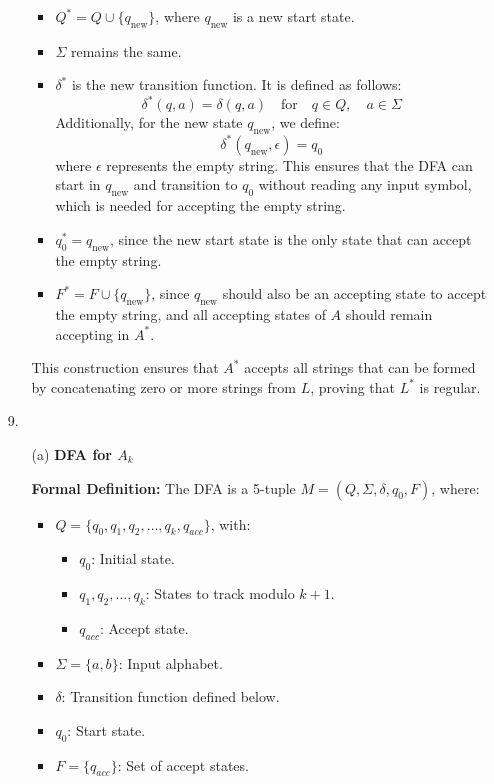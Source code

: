 \documentclass[9pt,tikz,border=2mm]{article}
\begin{document}
\begin{enumerate}
\begin{enumerate}
    \begin{itemize}
        \item \( Q^* = Q \cup \{q_{\text{new}}\} \), where \( q_{\text{new}} \) is a new start state.
        \item \( \Sigma \) remains the same.
        \item \( \delta^* \) is the new transition function. It is defined as follows:
        \[
        \delta^*(q, a) = \delta(q, a) \quad \text{for} \quad q \in Q, \quad a \in \Sigma
        \]
        Additionally, for the new state \( q_{\text{new}} \), we define:
        \[
        \delta^*(q_{\text{new}}, \epsilon) = q_0
        \]
        where \( \epsilon \) represents the empty string. This ensures that the DFA can start in \( q_{\text{new}} \) and transition to \( q_0 \) without reading any input symbol, which is needed for accepting the empty string.
        \item \( q_0^* = q_{\text{new}} \), since the new start state is the only state that can accept the empty string.
        \item \( F^* = F \cup \{q_{\text{new}}\} \), since \( q_{\text{new}} \) should also be an accepting state to accept the empty string, and all accepting states of \( A \) should remain accepting in \( A^* \).
    \end{itemize}

    This construction ensures that \( A^* \) accepts all strings that can be formed by concatenating zero or more strings from \( L \), proving that \( L^* \) is regular.

\end{enumerate}

        \item[9.]

        \begin{enumerate}

\item[(a)] \textbf{ DFA for \( A_k \)}

\textbf{Formal Definition:}  
The DFA is a 5-tuple \( M = (Q, \Sigma, \delta, q_0, F) \), where:
\begin{itemize}
    \item \( Q = \{q_0, q_1, q_2, \ldots, q_k, q_{acc}\} \), with:
    \begin{itemize}
        \item \( q_0 \): Initial state.
        \item \( q_1, q_2, \ldots, q_k \): States to track modulo \( k+1 \).
        \item \( q_{acc} \): Accept state.
    \end{itemize}
    \item \( \Sigma = \{a, b\} \): Input alphabet.
    \item \( \delta \): Transition function defined below.
    \item \( q_0 \): Start state.
    \item \( F = \{q_{acc}\} \): Set of accept states.
\end{itemize}


\end{enumerate}
\end{enumerate}
\end{document}
